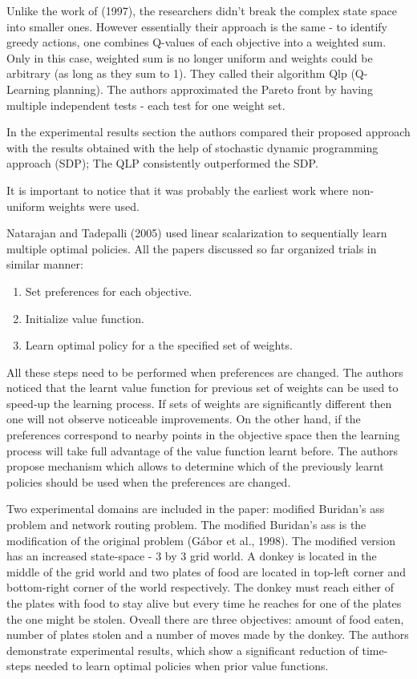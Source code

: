 Unlike the work of (1997)\nocite{Karlsson97learningto}, the researchers didn't break the complex state space into smaller ones. However essentially their approach is the same - to identify greedy actions, one combines Q-values of each objective into a weighted sum. Only in this case, weighted sum is no longer uniform and weights could be arbitrary (as long as they sum to 1). They called their algorithm Qlp (Q-Learning planning). The authors approximated the Pareto front by having multiple independent tests - each test for one weight set.

In the experimental results section the authors compared their proposed approach with the results obtained with the help of stochastic dynamic programming approach (SDP); The QLP consistently outperformed the SDP.

It is important to notice that it was probably the earliest work where non-uniform weights were used.

Natarajan and Tadepalli (2005)\nocite{natarajan2005dynamic} used linear scalarization to sequentially learn multiple optimal policies. All the papers discussed so far
organized trials in similar manner:

\begin{enumerate}
  \item Set preferences for each objective.
  \item Initialize value function.
  \item Learn optimal policy for a the specified set of weights.
\end{enumerate}

All these steps need to be performed when preferences are changed. The authors noticed that the learnt value function for previous set of weights can be used to speed-up the learning process. If sets of weights are significantly different then one will not observe noticeable improvements. On the other hand, if the preferences correspond to nearby points in the objective space then the learning process will take full advantage of the value function learnt before. The authors propose mechanism which allows to determine which of the previously learnt policies should be used when the preferences are changed.

Two experimental domains are included in the paper: modified Buridan’s ass problem and network routing problem. The modified Buridan’s ass is the modification of the original problem (G{\'a}bor et al., 1998\nocite{gabor1998multi}). The modified version has an increased state-space - 3 by 3 grid world. A donkey is located in the middle of the grid world and two plates of food are located in top-left corner and bottom-right corner of the world respectively. The donkey must reach either of the plates with food to stay alive but every time he reaches for one of the plates the one might be stolen. Oveall there are three objectives: amount of food eaten, number of plates stolen and a number of moves made by the donkey. The authors demonstrate experimental results, which show a significant reduction of time-steps needed to learn optimal policies when prior value functions.

